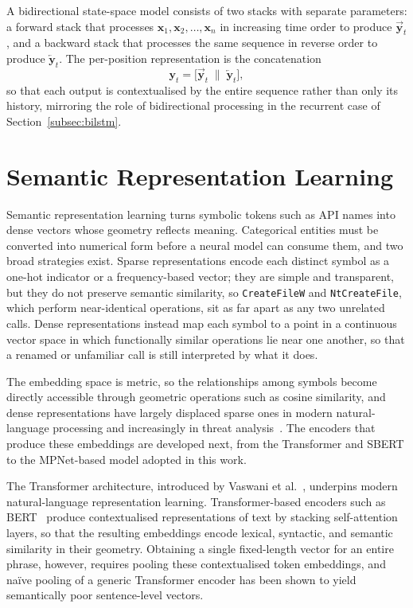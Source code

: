 \documentclass[%
    BCOR=10mm,
    DIV=13,
    toc=bibliography,
    toc=listof,
    oneside,
    12pt,
]{scrbook}
\begin{document}
A bidirectional state-space model consists of two stacks with separate
parameters: a forward stack that processes
$\mathbf{x}_1, \mathbf{x}_2, \ldots, \mathbf{x}_n$ in increasing time order to
produce $\overrightarrow{\mathbf{y}}_t$, and a backward stack that processes the
same sequence in reverse order to produce $\overleftarrow{\mathbf{y}}_t$. The
per-position representation is the concatenation
\begin{equation}
  \mathbf{y}_t = \bigl[ \overrightarrow{\mathbf{y}}_t \;\|\; \overleftarrow{\mathbf{y}}_t \bigr],
  \label{eq:bimamba}
\end{equation}
so that each output is contextualised by the entire sequence rather than only
its history, mirroring the role of bidirectional processing in the recurrent
case of Section~\ref{subsec:bilstm}.
\fi

\section{Semantic Representation Learning}
\label{sec:semantic}

Semantic representation learning turns symbolic tokens such as API names into
dense vectors whose geometry reflects meaning. Categorical entities must be
converted into numerical form before a neural model can consume them, and two
broad strategies exist. Sparse representations encode each distinct symbol as a
one-hot indicator or a frequency-based vector; they are simple and transparent,
but they do not preserve semantic similarity, so \texttt{CreateFileW} and
\texttt{NtCreateFile}, which perform near-identical operations, sit as far apart
as any two unrelated calls. Dense representations instead map each symbol to a
point in a continuous vector space in which functionally similar operations lie
near one another, so that a renamed or unfamiliar call is still interpreted by
what it does.

The embedding space is metric, so the relationships among symbols become
directly accessible through geometric operations such as cosine similarity, and
dense representations have largely displaced sparse ones in modern
natural-language processing and increasingly in threat
analysis~\cite{amer2025graphshield}. The encoders that produce these embeddings
are developed next, from the Transformer and SBERT to the MPNet-based model
adopted in this work.

The Transformer architecture, introduced by Vaswani et al.~\cite{vaswani2017},
underpins modern natural-language representation learning. Transformer-based
encoders such as BERT~\cite{devlin2019bert} produce contextualised
representations of text by stacking self-attention layers, so that the resulting
embeddings encode lexical, syntactic, and semantic similarity in their geometry.
Obtaining a single fixed-length vector for an entire phrase, however, requires
pooling these contextualised token embeddings, and na\"ive pooling of a generic
Transformer encoder has been shown to yield semantically poor sentence-level
vectors.
\end{document}
